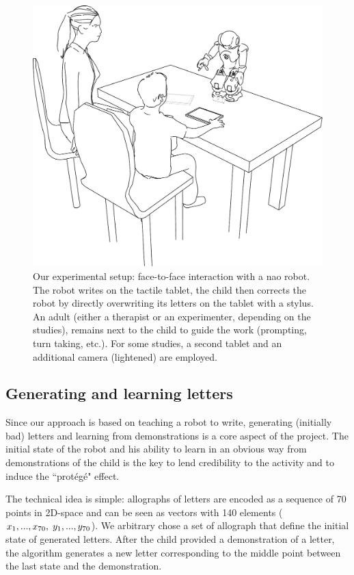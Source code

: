 \documentclass{sig-alternate}
\begin{document}
   \begin{figure}
       \centering
       \includegraphics[width=0.6\columnwidth]{experimental_setup}
       \caption{\small Our experimental setup: face-to-face interaction with a {\sc
           nao} robot.  The robot writes on the tactile tablet, the child then
           corrects the robot by directly overwriting its letters on the tablet
           with a stylus. An adult (either a therapist or an experimenter,
           depending on the studies), remains next to the child to guide the work
           (prompting, turn taking, etc.). For some studies, a second tablet and an
           additional camera (lightened) are employed.}

       \label{experimental_setup}
   \end{figure}

\subsection{Generating and learning letters}
Since our approach is based on teaching a robot to write, generating (initially
bad) letters and learning from demonstrations is a core aspect of the project.
The initial state of the robot and his ability to learn in an obvious way
from demonstrations of the child is the key to lend credibility to the activity and to induce the ``prot\'eg\'e" effect.

The technical idea is simple: allographs of letters are encoded as a sequence of 70 points in
2D-space and can be seen as vectors with 140 elements
($x_1,...,x_{70},\hspace{1mm}y_1,...,y_{70}$). We arbitrary chose a set of allograph
that define the initial state of generated letters. 
After the child provided a demonstration of a letter, the algorithm
generates a new letter corresponding to the middle point between the last state and the
demonstration. 
\end{document}
